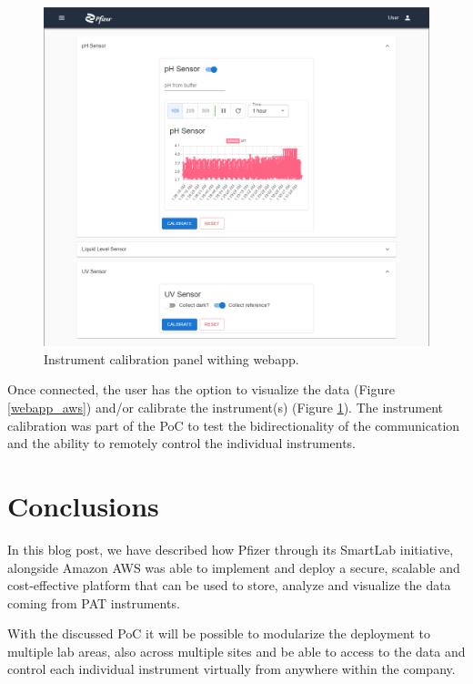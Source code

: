 \documentclass[10pt]{article}
\begin{document}
\begin{figure}[h]
\centering
\includegraphics[width=1\textwidth]{webapp_aws2}
\caption{Instrument calibration panel withing webapp.}
\label{webapp_aws2}
\end{figure}

Once connected, the user has the option to visualize the data
(Figure \ref{webapp_aws}) and/or calibrate the instrument(s)
(Figure \ref{webapp_aws2}). The instrument calibration was part of the PoC
to test the bidirectionality of the communication and the ability to
remotely control the individual instruments.

\section*{Conclusions}

In this blog post, we have described how Pfizer through its SmartLab initiative,
alongside Amazon AWS was able to implement and deploy a secure, 
scalable and cost-effective platform that can be used to store, 
analyze and visualize the data coming from PAT instruments.

With the discussed PoC it will be possible to modularize the deployment
to multiple lab areas, also across multiple sites and be able to access to the data
and control each individual instrument virtually from anywhere within the company.
\end{document}
